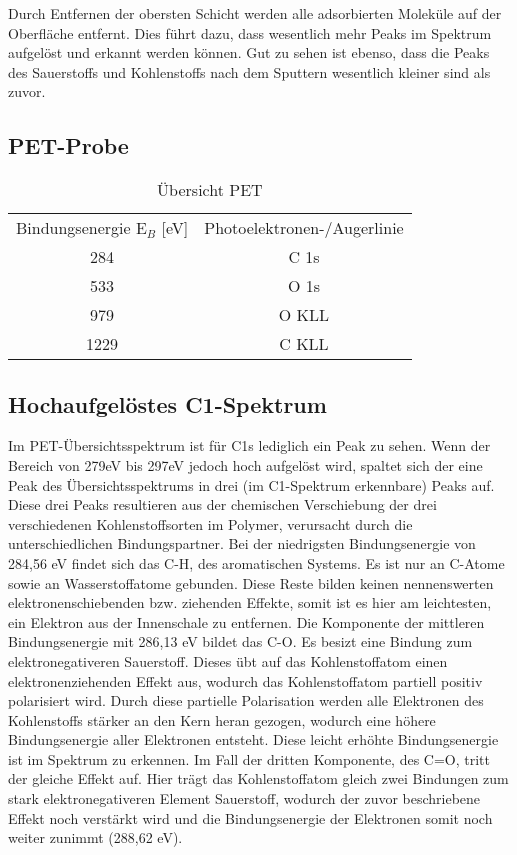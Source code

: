 \documentclass{article}
\begin{document}
Durch Entfernen der obersten Schicht werden alle adsorbierten Moleküle auf der Oberfläche entfernt. Dies führt dazu, dass wesentlich mehr Peaks im Spektrum aufgelöst und erkannt werden können. Gut zu sehen ist ebenso, dass die Peaks des Sauerstoffs und Kohlenstoffs nach dem Sputtern wesentlich kleiner sind als zuvor.

\subsection{PET-Probe}

\begin{table}[htpb]
  \centering
  \caption{Übersicht PET}
  \label{tab:chsc}
  \begin{tabular}{cc}
   Bindungsenergie E$_B$ [eV] & Photoelektronen-/Augerlinie\\
 284  & C 1s \\
 533 & O 1s \\
 979 & O KLL \\
 1229 & C KLL \\
   \end{tabular}
\end{table}
  


\subsection{Hochaufgelöstes C1-Spektrum }

Im PET-Übersichtsspektrum ist für C1s lediglich ein Peak zu sehen. Wenn der Bereich von 279eV bis 297eV jedoch hoch aufgelöst wird, spaltet sich der eine Peak des Übersichtsspektrums in drei (im C1-Spektrum erkennbare) Peaks auf. Diese drei Peaks resultieren aus der chemischen Verschiebung der drei verschiedenen Kohlenstoffsorten im Polymer, verursacht durch die unterschiedlichen Bindungspartner. Bei der niedrigsten Bindungsenergie von 284,56 eV findet sich das C-H, des aromatischen Systems. Es ist nur an C-Atome sowie an Wasserstoffatome gebunden. Diese Reste bilden keinen nennenswerten elektronenschiebenden bzw. ziehenden Effekte, somit ist es hier am leichtesten, ein Elektron aus der Innenschale zu entfernen. Die Komponente der mittleren Bindungsenergie mit 286,13 eV bildet das C-O. Es besizt eine Bindung zum  elektronegativeren Sauerstoff. Dieses übt auf das Kohlenstoffatom einen elektronenziehenden Effekt aus, wodurch das Kohlenstoffatom partiell positiv polarisiert wird. Durch diese partielle Polarisation werden alle Elektronen des Kohlenstoffs stärker an den Kern heran gezogen, wodurch eine höhere Bindungsenergie aller Elektronen entsteht. Diese leicht erhöhte Bindungsenergie ist im Spektrum zu erkennen.
Im Fall der dritten Komponente, des C=O,  tritt der gleiche Effekt auf. Hier trägt das Kohlenstoffatom gleich zwei Bindungen zum stark elektronegativeren Element Sauerstoff, wodurch der zuvor beschriebene Effekt noch verstärkt wird und die Bindungsenergie der Elektronen somit noch weiter zunimmt (288,62 eV).
\end{document}
